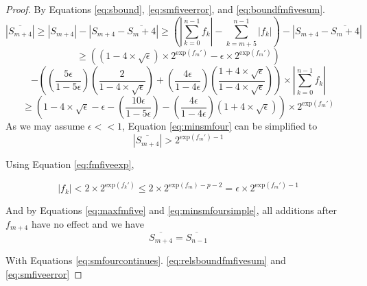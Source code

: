 \documentclass[12pt]{article}
\providecommand{\exp}{\ensuremath{\text{exp}}}
\theoremstyle{definition}
\numberwithin{equation}{section}
\begin{document}
\begin{proof}
      By Equations \ref{eq:sbound}, \ref{eq:smfiveerror}, and \ref{eq:boundfmfivesum}.
        \begin{equation*}
          |\overline{S_{m + 4}}| \geq |S_{m + 4}| - |S_{m + 4} - \overline{S_m + 4}| \geq (|\sum\limits_{k = 0}^{n - 1} f_k| - \sum\limits_{k = m + 5}^{n - 1}|f_k|) - |S_{m + 4} - \overline{S_m + 4}|
        \end{equation*}
        \begin{equation*}
          \geq ((1 - 4 \times \sqrt\epsilon)\times 2^{\exp(f_m')} - \epsilon \times 2^{\exp(f_m')})
        \end{equation*}
        \begin{equation*}
          - ((\frac{5\epsilon}{1 - 5 \epsilon})(\frac{2}{1 - 4 \times \sqrt\epsilon}) + (\frac{4\epsilon}{1 - 4 \epsilon})(\frac{1 + 4 \times \sqrt\epsilon}{1 - 4 \times \sqrt\epsilon})) \times |\sum\limits_{k = 0}^{n - 1} f_k|
        \end{equation*}
        \begin{equation}
          \geq (1 - 4 \times \sqrt\epsilon - \epsilon - (\frac{10\epsilon}{1 - 5 \epsilon}) - (\frac{4\epsilon}{1 - 4 \epsilon})(1 + 4 \times \sqrt\epsilon))\times 2^{\exp(f_m')}
          \label{eq:minsmfour}
        \end{equation}
        As we may assume $\epsilon << 1$, Equation \ref{eq:minsmfour} can be simplified to
        \begin{equation}
          |\overline{S_{m + 4}}| > 2^{\exp(f_m') - 1}
          \label{eq:minsmfoursimple}
        \end{equation}

        Using Equation \ref{eq:fmfiveexp},

        \begin{equation}
          |f_k| < 2 \times 2^{\exp(f_k')} \leq 2 \times 2^{\exp(f_m) - p - 2} = \epsilon \times 2^{\exp(f_m') - 1}
          \label{eq:maxfmfive}
        \end{equation}

        And by Equations \ref{eq:maxfmfive} and \ref{eq:minsmfoursimple}, all additions after $f_{m + 4}$ have no effect and we have
        \begin{equation}
          \overline{S_{m + 4}} = \overline{S_{n - 1}}
          \label{eq:smfourcontinues}
        \end{equation}

        With Equations \ref{eq:smfourcontinues}. \ref{eq:relsboundfmfivesum} and \ref{eq:smfiveerror}


\end{proof}
\end{document}
